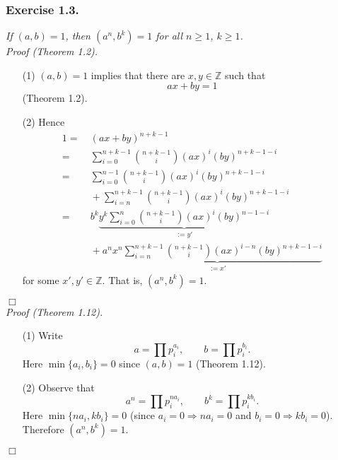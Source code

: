 \documentclass{article}
\begin{document}



\subsubsection*{Exercise 1.3.}
\emph{If $(a,b) = 1$, then $(a^n,b^k) = 1$ for all $n \geq 1$, $k \geq 1$.} \\



\emph{Proof (Theorem 1.2).}
\begin{enumerate}
\item[(1)]
  $(a,b) = 1$ implies that there are $x, y \in \mathbb{Z}$ such that
  \[
    ax + by = 1
  \]
  (Theorem 1.2).

\item[(2)]
  Hence
  \begin{align*}
    1
    =& \: (ax + by)^{n+k-1} \\
    =& \: \sum_{i=0}^{n+k-1} {n+k-1 \choose i} (ax)^i (by)^{n+k-1-i} \\
    =& \: \sum_{i=0}^{n-1} {n+k-1 \choose i} (ax)^i (by)^{n+k-1-i} \\
        & \: + \sum_{i=n}^{n+k-1} {n+k-1 \choose i} (ax)^i (by)^{n+k-1-i} \\
    =& \: b^k \underbrace{y^k \sum_{i=0}^{n} {n+k-1 \choose i} (ax)^i (by)^{n-1-i}}_{:= y'} \\
        & \: + a^n \underbrace{x^n \sum_{i=n}^{n+k-1} {n+k-1 \choose i} (ax)^{i-n} (by)^{n+k-1-i}}_{:= x'}
  \end{align*}
  for some $x', y' \in \mathbb{Z}$.
  That is, $(a^n,b^k) = 1$.
\end{enumerate}
$\Box$ \\



\emph{Proof (Theorem 1.12).}
\begin{enumerate}
\item[(1)]
  Write
  \[
    a = \prod p_i^{a_i}, \qquad
    b = \prod p_i^{b_i}.
  \]
  Here $\min\{a_i, b_i\} = 0$ since $(a,b) = 1$ (Theorem 1.12).

\item[(2)]
  Observe that
  \[
    a^n = \prod p_i^{na_i}, \qquad
    b^k = \prod p_i^{kb_i}.
  \]
  Here $\min\{n a_i, k b_i\} = 0$
  (since $a_i = 0 \Longrightarrow na_i = 0$ and $b_i = 0 \Longrightarrow kb_i = 0$).
  Therefore $(a^n,b^k) = 1$.
\end{enumerate}
$\Box$ \\\\
\end{document}
